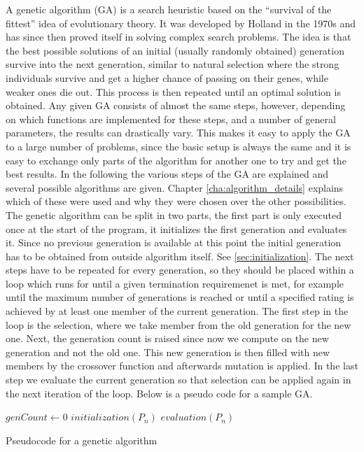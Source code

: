 A genetic algorithm (GA) is a search heuristic based on the "`survival of the fittest"' idea of evolutionary theory. It was developed by Holland in the 1970s \cite{15} and has since then proved itself in solving complex search problems. The idea is that the best possible solutions of an initial (usually randomly obtained) generation survive into the next generation, similar to natural selection where the strong individuals survive and get a higher chance of passing on their genes, while weaker ones die out. This process is then repeated until an optimal solution is obtained. Any given GA consists of almost the same steps, however, depending on which functions are implemented for these steps, and a number of general parameters, the results can drastically vary. This makes it easy to apply the GA to a large number of problems, since the basic setup is always the same and it is easy to exchange only parts of the algorithm for another one to try and get the best results. In the following the various steps of the GA are explained and several possible algorithms are given. Chapter \ref{cha:algorithm_details} explains which of these were used and why they were chosen over the other possibilities. 
The genetic algorithm can be split in two parts, the first part is only executed once at the start of the program, it initializes the first generation and evaluates it. Since no previous generation is available at this point the initial generation has to be obtained from outside algorithm itself. See \ref{sec:initialization}.
The next steps have to be repeated for every generation, so they should be placed within a loop which runs for until a given termination requiremenet is met, for example until the maximum number of generations is reached or until a specified rating is achieved by at least one member of the current generation. The first step in the loop is the selection, where we take member from the old generation for the new one. Next, the generation count is raised since now we compute on the new generation and not the old one. This new generation is then filled with new members by the crossover function and afterwards mutation is applied. In the last step we evaluate the current generation so that selection can be applied again in the next iteration of the loop.
Below is a pseudo code for a sample GA.
\vspace{1cm}
\begin{algorithm}[H]
	\SetAlgoLined
	$genCount\leftarrow0$\;
	$initialization(P_n)$\;
	$evaluation(P_n)$\;
	\caption{Pseudocode for a genetic algorithm}
\end{algorithm}
		

